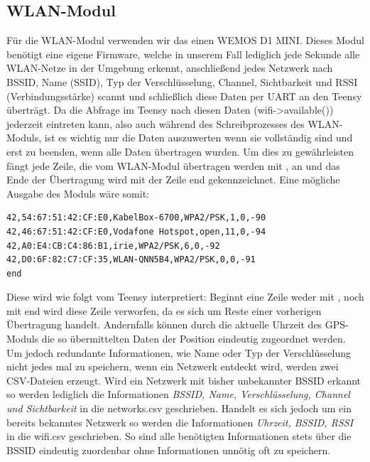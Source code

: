 \documentclass[a4paper,11pt, ngerman]{scrartcl}
\begin{document}
\subsection{WLAN-Modul}
Für die WLAN-Modul verwenden wir das einen \grqq WEMOS D1 MINI\grqq . Dieses Modul benötigt eine eigene Firmware, welche in unserem Fall lediglich jede Sekunde alle WLAN-Netze in der Umgebung erkennt, anschließend jedes Netzwerk nach BSSID, Name (SSID), Typ der Verschlüsselung, Channel, Sichtbarkeit und RSSI (Verbindungsstärke) scannt und schließlich diese Daten per UART an den Teensy überträgt. Da die Abfrage im Teensy nach diesen Daten (wifi->available()) jederzeit eintreten kann, also auch während des Schreibprozesses des WLAN-Moduls, ist es wichtig nur die Daten auszuwerten wenn sie vollständig sind und erst zu beenden, wenn alle Daten übertragen wurden. Um dies zu gewährleisten fängt jede Zeile, die vom WLAN-Modul übertragen werden mit ,\grqq{} an und das Ende der Übertragung wird mit der Zeile \grqq end\grqq{} gekennzeichnet. Eine mögliche Ausgabe des Moduls wäre somit:
\begin{lstlisting}
42,54:67:51:42:CF:E0,KabelBox-6700,WPA2/PSK,1,0,-90
42,46:67:51:42:CF:E0,Vodafone Hotspot,open,11,0,-94
42,A0:E4:CB:C4:86:B1,irie,WPA2/PSK,6,0,-92
42,D0:6F:82:C7:CF:35,WLAN-QNN5B4,WPA2/PSK,0,0,-91
end
\end{lstlisting}
Diese wird wie folgt vom Teensy interpretiert: Beginnt eine Zeile weder mit ,\grqq{} noch mit \grqq end\grqq{} wird diese Zeile verworfen, da es sich um Reste einer vorherigen Übertragung handelt. Andernfalls können durch die aktuelle Uhrzeit des GPS-Moduls die so übermittelten Daten der Position eindeutig zugeordnet werden. Um jedoch redundante Informationen, wie Name oder Typ der Verschlüsselung nicht jedes mal zu speichern, wenn ein Netzwerk entdeckt wird, werden zwei CSV-Dateien erzeugt. Wird ein Netzwerk mit bisher unbekannter BSSID erkannt so werden lediglich die Informationen \textit{BSSID, Name, Verschlüsselung, Channel und Sichtbarkeit} in die \grqq networks.csv\grqq{} geschrieben. Handelt es sich jedoch um ein bereits bekanntes Netzwerk so werden die Informationen \textit{Uhrzeit, BSSID, RSSI} in die \grqq wifi.csv \grqq{} geschrieben. So sind alle benötigten Informationen stets über die BSSID eindeutig zuordenbar ohne Informationen unnötig oft zu speichern.
\end{document}
